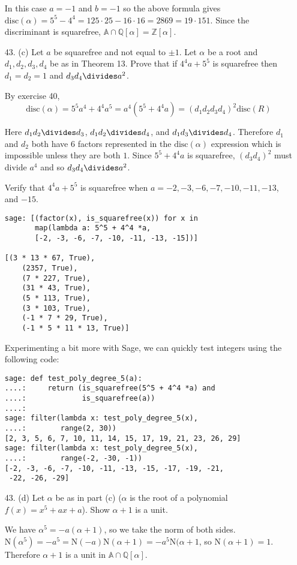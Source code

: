 \documentclass{article}
\newcommand{\Q}[0]{\mathbb{Q}}
\newcommand{\Z}[0]{\mathbb{Z}}
\newcommand{\norm}[0]{\text{N}}
\newcommand{\disc}[1]{\text{disc}(#1)}
\begin{document}
\begin{enumerate}
In this case $a = -1$ and $b = -1$ so the above formula gives $\disc{\alpha} = 5^5 - 4^4 = 125 \cdot 25 - 16 \cdot 16 = 2869 = 19 \cdot 151$.  Since the discriminant is squarefree, $\mathbb{A} \cap \Q[\alpha] = \Z[\alpha]$.

\item[43. (c)] Let $a$ be squarefree and not equal to $\pm 1$.  Let $\alpha$ be a root and $d_1, d_2, d_3, d_4$ be as in Theorem 13.  Prove that if $4^4 a + 5^5$ is squarefree then $d_1 = d_2 = 1$ and $d_3 d_4 \divides a^2$.

By exercise 40, \[ \disc{\alpha} = 5^5 a^4 + 4^4 a^5 = a^4(5^5 + 4^4 a) =(d_1 d_2 d_3 d_4)^2 \disc{R} \]

Here $d_1 d_2 \divides d_3$, $d_1 d_2 \divides d_4$, and $d_1 d_3 \divides d_4$.  Therefore $d_1$ and $d_2$ both have 6 factors represented in the $\disc{\alpha}$ expression which is impossible unless they are both $1$.  Since $5^5 + 4^4 a$ is squarefree, $(d_3 d_4)^2$ must divide $a^4$ and so $d_3 d_4 \divides a^2$.

Verify that $4^4 a + 5^5$ is squarefree when $a = -2, -3, -6, -7, -10, -11, -13$, and $-15$.

\begin{verbatim}
sage: [(factor(x), is_squarefree(x)) for x in
       map(lambda a: 5^5 + 4^4 *a,
       [-2, -3, -6, -7, -10, -11, -13, -15])]

[(3 * 13 * 67, True),
    (2357, True),
    (7 * 227, True),
    (31 * 43, True),
    (5 * 113, True),
    (3 * 103, True),
    (-1 * 7 * 29, True),
    (-1 * 5 * 11 * 13, True)]
    \end{verbatim}

    Experimenting a bit more with Sage, we can quickly test integers using the following code:
    \begin{verbatim}
sage: def test_poly_degree_5(a):
....:     return (is_squarefree(5^5 + 4^4 *a) and
....:             is_squarefree(a))
....:
sage: filter(lambda x: test_poly_degree_5(x),
....:        range(2, 30))
[2, 3, 5, 6, 7, 10, 11, 14, 15, 17, 19, 21, 23, 26, 29]
sage: filter(lambda x: test_poly_degree_5(x),
....:        range(-2, -30, -1))
[-2, -3, -6, -7, -10, -11, -13, -15, -17, -19, -21,
 -22, -26, -29]
\end{verbatim}

\item[43. (d)] Let $\alpha$ be as in part (c) ($\alpha$ is the root of a polynomial $f(x) = x^5 + ax + a$).  Show $\alpha + 1$ is a unit.

We have $\alpha^5 = -a(\alpha + 1)$, so we take the norm of both sides.  $\norm(\alpha^5) = -a^5 = \norm(-a) \norm(\alpha + 1) = -a^5 \norm(\alpha+1$, so $\norm(\alpha + 1) = 1$.  Therefore $\alpha + 1$ is a unit in $\mathbb{A} \cap \Q[\alpha]$.


\end{enumerate}
\end{document}

